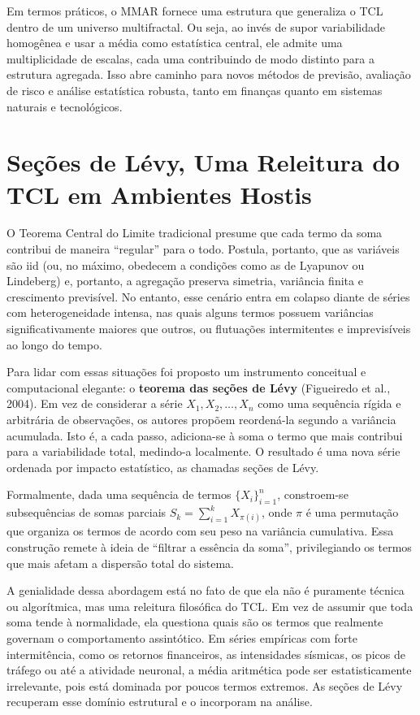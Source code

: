 \documentclass[
]{agujournal2019}
\begin{document}
Em termos práticos, o MMAR fornece uma estrutura que generaliza o TCL
dentro de um universo multifractal. Ou seja, ao invés de supor
variabilidade homogênea e usar a média como estatística central, ele
admite uma multiplicidade de escalas, cada uma contribuindo de modo
distinto para a estrutura agregada. Isso abre caminho para novos métodos
de previsão, avaliação de risco e análise estatística robusta, tanto em
finanças quanto em sistemas naturais e tecnológicos.

\section{Seções de Lévy, Uma Releitura do TCL em Ambientes
Hostis}\label{seuxe7uxf5es-de-luxe9vy-uma-releitura-do-tcl-em-ambientes-hostis}

O Teorema Central do Limite tradicional presume que cada termo da soma
contribui de maneira ``regular'' para o todo. Postula, portanto, que as
variáveis são iid (ou, no máximo, obedecem a condições como as de
Lyapunov ou Lindeberg) e, portanto, a agregação preserva simetria,
variância finita e crescimento previsível. No entanto, esse cenário
entra em colapso diante de séries com heterogeneidade intensa, nas quais
alguns termos possuem variâncias significativamente maiores que outros,
ou flutuações intermitentes e imprevisíveis ao longo do tempo.

Para lidar com essas situações foi proposto um instrumento conceitual e
computacional elegante: o \textbf{teorema das seções de Lévy}
(Figueiredo et al., 2004). Em vez de considerar a série
\(X_1, X_2, \dots, X_n\) como uma sequência rígida e arbitrária de
observações, os autores propõem reordená-la segundo a variância
acumulada. Isto é, a cada passo, adiciona-se à soma o termo que mais
contribui para a variabilidade total, medindo-a localmente. O resultado
é uma nova série ordenada por impacto estatístico, as chamadas seções de
Lévy.

Formalmente, dada uma sequência de termos \(\{X_i\}_{i=1}^n\),
constroem-se subsequências de somas parciais
\(S_k = \sum_{i=1}^k X_{\pi(i)}\), onde \(\pi\) é uma permutação que
organiza os termos de acordo com seu peso na variância cumulativa. Essa
construção remete à ideia de ``filtrar a essência da soma'',
privilegiando os termos que mais afetam a dispersão total do sistema.

A genialidade dessa abordagem está no fato de que ela não é puramente
técnica ou algorítmica, mas uma releitura filosófica do TCL. Em vez de
assumir que toda soma tende à normalidade, ela questiona quais são os
termos que realmente governam o comportamento assintótico. Em séries
empíricas com forte intermitência, como os retornos financeiros, as
intensidades sísmicas, os picos de tráfego ou até a atividade neuronal,
a média aritmética pode ser estatisticamente irrelevante, pois está
dominada por poucos termos extremos. As seções de Lévy recuperam esse
domínio estrutural e o incorporam na análise.
\end{document}
